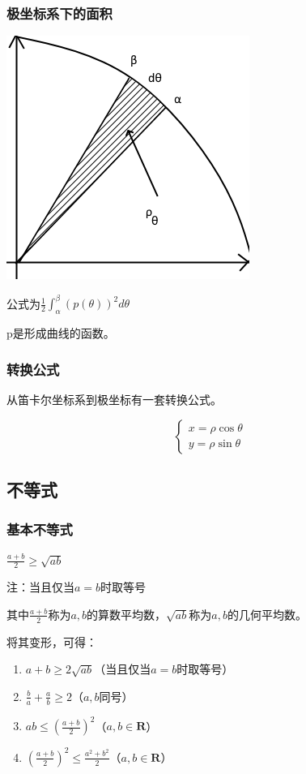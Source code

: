 \documentclass[UTF8]{ctexbook}
\newcommand{\definiteIntegral}[2]{\int^{#1}_{#2}}
\newcommand{\mathRealNumberCollection}{\mathbf{R}}
\begin{document}
{{{\subsubsection{极坐标系下的面积}{
  \includegraphics{resources/polar_coordness.png}

  公式为$\frac{1}{2}\definiteIntegral{\beta}{\alpha}(p(\theta))^2d\theta$

  p是形成曲线的函数。
  }%

  \subsubsection{转换公式}{
    从笛卡尔坐标系到极坐标有一套转换公式。

    $$
      \begin{cases}
        x = \rho\cos\theta \\
        y = \rho\sin\theta
      \end{cases}
    $$
  }%

}%

\subsection{不等式}{

\subsubsection{基本不等式}{
  $\frac{a + b}{2} \geq \sqrt{ab}$

  注：当且仅当$a = b$时取等号

  其中$\frac{a+b}{2}$称为$a,b$的算数平均数，$\sqrt{ab}$称为$a,b$的几何平均数。

  将其变形，可得：
  \begin{enumerate}
    \item $a + b \geq 2\sqrt{ab}$（当且仅当$a = b$时取等号）
    \item $\frac{b}{a} + \frac{a}{b} \geq 2$（$a,b$同号）
    \item $ab \leq (\frac{a + b}{2})^2$（$a,b\in\mathRealNumberCollection$）
    \item $(\frac{a + b}{2})^2 \leq \frac{a^2 + b^2}{2}$（$a,b\in\mathRealNumberCollection$）
  \end{enumerate}
}%

}}}
\end{document}
